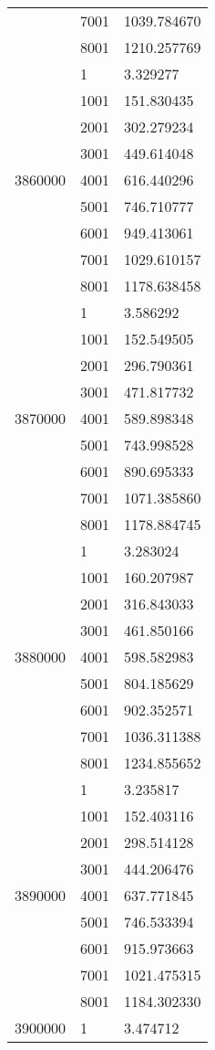 \begin{table}[htb!]
\begin{tabular}{lll}
 & 7001 & 1039.784670 \\
 & 8001 & 1210.257769 \\
\multirow[c]{9}{*}{3860000} & 1 & 3.329277 \\
 & 1001 & 151.830435 \\
 & 2001 & 302.279234 \\
 & 3001 & 449.614048 \\
 & 4001 & 616.440296 \\
 & 5001 & 746.710777 \\
 & 6001 & 949.413061 \\
 & 7001 & 1029.610157 \\
 & 8001 & 1178.638458 \\
\multirow[c]{9}{*}{3870000} & 1 & 3.586292 \\
 & 1001 & 152.549505 \\
 & 2001 & 296.790361 \\
 & 3001 & 471.817732 \\
 & 4001 & 589.898348 \\
 & 5001 & 743.998528 \\
 & 6001 & 890.695333 \\
 & 7001 & 1071.385860 \\
 & 8001 & 1178.884745 \\
\multirow[c]{9}{*}{3880000} & 1 & 3.283024 \\
 & 1001 & 160.207987 \\
 & 2001 & 316.843033 \\
 & 3001 & 461.850166 \\
 & 4001 & 598.582983 \\
 & 5001 & 804.185629 \\
 & 6001 & 902.352571 \\
 & 7001 & 1036.311388 \\
 & 8001 & 1234.855652 \\
\multirow[c]{9}{*}{3890000} & 1 & 3.235817 \\
 & 1001 & 152.403116 \\
 & 2001 & 298.514128 \\
 & 3001 & 444.206476 \\
 & 4001 & 637.771845 \\
 & 5001 & 746.533394 \\
 & 6001 & 915.973663 \\
 & 7001 & 1021.475315 \\
 & 8001 & 1184.302330 \\
\multirow[c]{9}{*}{3900000} & 1 & 3.474712 \\

\end{tabular}
\end{table}
